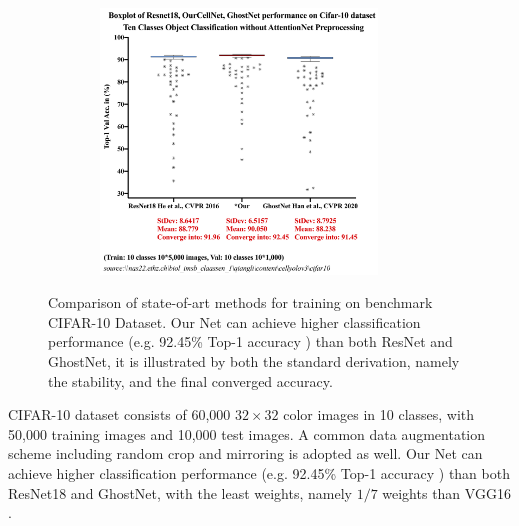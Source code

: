 \begin{figure}[h]
\centering
\includegraphics[height=200pt, width=0.9\textwidth]{thesis-template-master/images/Cifar-12-06-2020.png}
\label{fig}
\centering
\caption{Comparison of state-of-art methods for training on benchmark CIFAR-10 Dataset. Our Net can achieve higher classification performance  (e.g.  92.45\%  Top-1  accuracy ) than both ResNet and GhostNet, it is illustrated by both the standard derivation, namely the stability, and the final converged accuracy.}
\end{figure}
CIFAR-10 dataset\cite{b21} consists of 60,000 $32 \times 32$ color images in 10 classes, with 50,000 training images and 10,000 test images. A common data augmentation scheme including random crop\cite{b22} and mirroring\cite{b19} is adopted as well. Our Net can achieve higher classification performance  (e.g.  92.45\%  Top-1  accuracy  ) than both ResNet18 and GhostNet, with the least  weights, namely $1/7$ weights than VGG16 \cite{b23}. 




